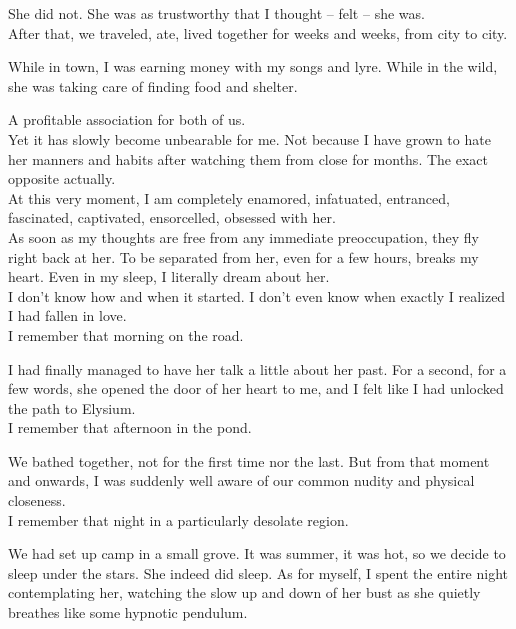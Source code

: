 \documentclass{report}
\begin{document}
She did not. She was as trustworthy that I thought – felt – she was.\\

After that, we traveled, ate, lived together for weeks and weeks, from city to city.

While in town, I was earning money with my songs and lyre. While in the wild, she was taking care of finding food and shelter.

A profitable association for both of us.\\

Yet it has slowly become unbearable for me. Not because I have grown to hate her manners and habits after watching them from close for months. The exact opposite actually.\\

At this very moment, I am completely enamored, infatuated, entranced, fascinated, captivated, ensorcelled, obsessed with her.\\

As soon as my thoughts are free from any immediate preoccupation, they fly right back at her. To be separated from her, even for a few hours, breaks my heart. Even in my sleep, I literally dream about her.\\

I don't know how and when it started. I don't even know when exactly I realized I had fallen in love.\\

I remember that morning on the road.

I had finally managed to have her talk a little about her past. For a second, for a few words, she opened the door of her heart to me, and I felt like I had unlocked the path to Elysium.\\

I remember that afternoon in the pond.

We bathed together, not for the first time nor the last. But from that moment and onwards, I was suddenly well aware of our common nudity and physical closeness.\\

I remember that night in a particularly desolate region.

We had set up camp in a small grove. It was summer, it was hot, so we decide to sleep under the stars. She indeed did sleep. As for myself, I spent the entire night contemplating her, watching the slow up and down of her bust as she quietly breathes like some hypnotic pendulum.\\
\end{document}
